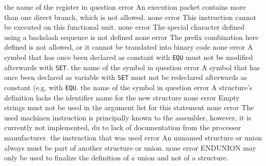\documentclass[12pt,twoside]{report}
\begin{document}
\begin{description}
               {the name of the register in question}
               {error}
               {An execution packet contains more than one direct branch,
                which is not allowed.}
               {none}
               {error}
               {This instruction cannot be executed on this functional
                unit.}
               {none}
               {error}
               {The special character defined using a backslash sequence
                is not defined}
               {none}
               {error}
               {The prefix combination here defined is not allowed, or it
                cannot be translated into binary code}
               {none}
               {error}
               {A symbol that has once been declared as constant with
                {\tt EQU} must not be modified afterwards with {\tt SET}.}
               {the name of the symbol in question}
               {error}
               {A symbol that has once been declared as variable with
                {\tt SET} must not be redeclared afterwards as constant
                (e.g. with {\tt EQU}.}
               {the name of the symbol in question}
               {error}
               {A structure's definition lacks the identifier name for the
                new structure}
               {none}
               {error}
               {Empty strings must not be used in the argument list for
                this statement}
               {none}
               {error}
               {The used machinen instruction is principally known
                to the assembler, however, it is currently not
                implemented, du to lack of documentation from the
                processor manufacturer.}
               {the instruction that was used}
               {error}
               {An unnamed structure or union always must be part
                of another structure or union.}
               {none}
               {error}
               {ENDUNION may only be used to finalize the definition
                of a union and not of a structure.}

\end{description}
\end{document}
